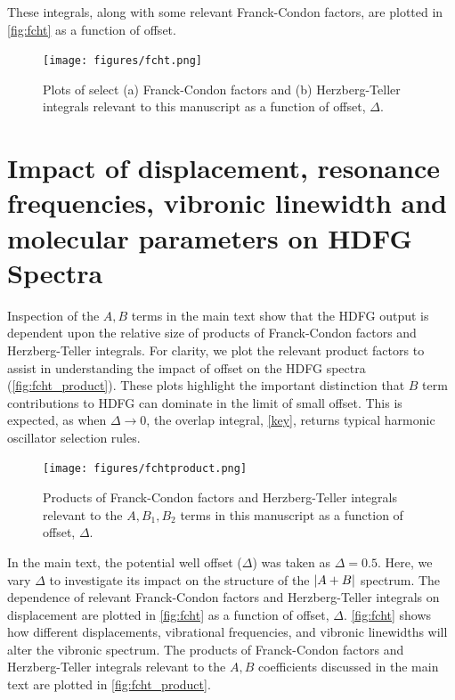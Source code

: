 \documentclass[aip, jcp, reprint, onecolumn, nofootinbib]{revtex4-2}
\begin{document}
These integrals, along with some relevant Franck-Condon factors, are plotted in \autoref{fig:fcht} as a function of offset. 

\begin{figure}[!htbp]
	\centering
	\texttt{[image: figures/fcht.png]}
	\caption{Plots of select (a) Franck-Condon factors and (b) Herzberg-Teller integrals relevant to this manuscript as a function of offset, $\Delta$.} 
	\label{fig:fcht}
\end{figure}


\newpage
\section{Impact of displacement, resonance frequencies, vibronic linewidth and molecular parameters on HDFG Spectra}
Inspection of the $A,B$ terms in the main text show that the HDFG output is dependent upon the relative size of products of Franck-Condon factors and Herzberg-Teller integrals.
For clarity, we plot the relevant product factors to assist in understanding the impact of offset on the HDFG spectra (\autoref{fig:fcht_product}).
These plots highlight the important distinction that $B$ term contributions to HDFG can dominate in the limit of small offset.
This is expected, as when $\Delta \rightarrow 0$, the overlap integral, \autoref{key}, returns typical harmonic oscillator selection rules.

\begin{figure}[!htbp]
	\centering
	\texttt{[image: figures/fchtproduct.png]}
	\caption{Products of Franck-Condon factors and Herzberg-Teller integrals relevant to the $A, B_1, B_2$ terms in this manuscript as a function of offset, $\Delta$.} 
	\label{fig:fcht_product}
\end{figure}

In the main text, the potential well offset ($\Delta$) was taken as $\Delta = 0.5$.
Here, we vary $\Delta$ to investigate its impact on the structure of the $\abs{A+B}$ spectrum.
The dependence of relevant Franck-Condon factors and Herzberg-Teller integrals on displacement are plotted in \autoref{fig:fcht} as a function of offset, $\Delta$.
\autoref{fig:fcht} shows how different displacements, vibrational frequencies, and vibronic linewidths will alter the vibronic spectrum.
The products of Franck-Condon factors and Herzberg-Teller integrals relevant to the $A,B$ coefficients discussed in the main text are plotted in \autoref{fig:fcht_product}.

\pagebreak
\end{document}
